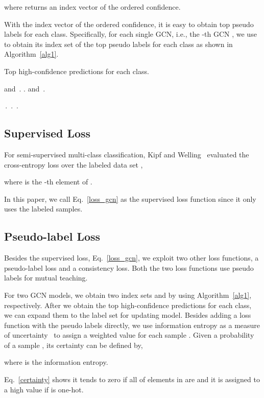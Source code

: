 \documentclass{article}
\begin{document}
where  returns an index vector of the ordered confidence.

With the index vector of the ordered confidence, it is easy to obtain top  pseudo labels for each class. Specifically, for each single GCN, i.e., the -th GCN , we use  to obtain its index set  of the top  pseudo labels for each class as shown in Algorithm~\ref{alg1}.
\begin{algorithm}[!htbp]
\caption{Top  high-confidence predictions for each class.}\label{alg1}
\begin{algorithmic}[1]
  and \,.
 .
  and \,.
\For{}
    \For{}

        \If{\,\&\,\,\&\,}
            \State \,.
            \State \,.
            \State \,.
        \EndIf
    \EndFor
\EndFor
\end{algorithmic}
\end{algorithm}
\subsection{Supervised Loss}
For semi-supervised multi-class classification, Kipf and Welling~\cite{kipf2016semi} evaluated the cross-entropy loss over the labeled data set ,

where  is the -th element of .

In this paper, we call Eq.~\eqref{loss_gcn} as the supervised loss function since it only uses the labeled samples.
\subsection{Pseudo-label Loss}
Besides the supervised loss, Eq.~\eqref{loss_gcn}, we exploit two other loss functions, a pseudo-label loss and a consistency loss. Both the two loss functions use pseudo labels for mutual teaching.

For two GCN models, we obtain two index sets  and  by using Algorithm~\ref{alg1}, respectively. After we obtain the top  high-confidence predictions for each class, we can expand them to the label set for updating model. Besides adding a loss function with the pseudo labels directly, we use information entropy as a measure of uncertainty~\cite{iscen2019label} to assign a weighted value for each sample . Given a probability  of a sample , its certainty  can be defined by,

where  is the information entropy.

Eq.~\eqref{certainty} shows it tends to zero if all of elements in  are  and it is assigned to a high value if  is one-hot.
\end{document}
